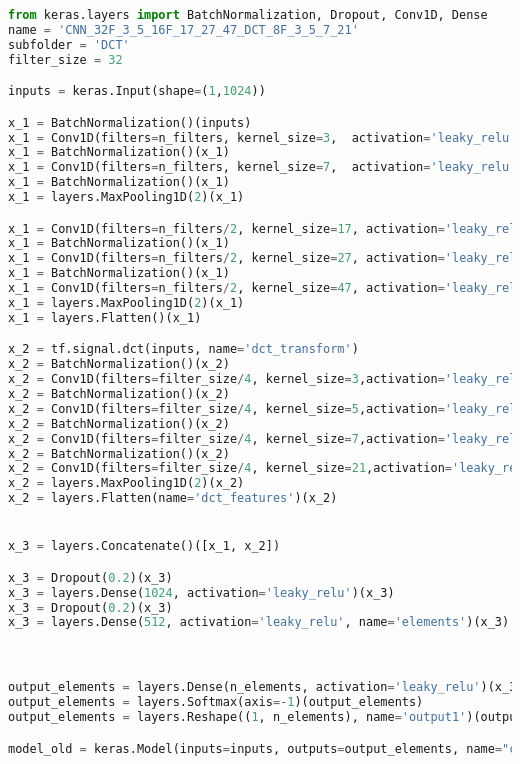 \begin{lstlisting}[language=Python]
from keras.layers import BatchNormalization, Dropout, Conv1D, Dense
name = 'CNN_32F_3_5_16F_17_27_47_DCT_8F_3_5_7_21'
subfolder = 'DCT'
filter_size = 32

inputs = keras.Input(shape=(1,1024))

x_1 = BatchNormalization()(inputs)
x_1 = Conv1D(filters=n_filters, kernel_size=3,  activation='leaky_relu', data_format='channels_first')(x_1)
x_1 = BatchNormalization()(x_1)
x_1 = Conv1D(filters=n_filters, kernel_size=7,  activation='leaky_relu', data_format='channels_first')(x_1)
x_1 = BatchNormalization()(x_1)
x_1 = layers.MaxPooling1D(2)(x_1)

x_1 = Conv1D(filters=n_filters/2, kernel_size=17, activation='leaky_relu', data_format='channels_first')(x_1)
x_1 = BatchNormalization()(x_1)
x_1 = Conv1D(filters=n_filters/2, kernel_size=27, activation='leaky_relu', data_format='channels_first')(x_1)
x_1 = BatchNormalization()(x_1)
x_1 = Conv1D(filters=n_filters/2, kernel_size=47, activation='leaky_relu', data_format='channels_first')(x_1)
x_1 = layers.MaxPooling1D(2)(x_1)
x_1 = layers.Flatten()(x_1)

x_2 = tf.signal.dct(inputs, name='dct_transform')
x_2 = BatchNormalization()(x_2)
x_2 = Conv1D(filters=filter_size/4, kernel_size=3,activation='leaky_relu', data_format='channels_first')(x_2)
x_2 = BatchNormalization()(x_2)
x_2 = Conv1D(filters=filter_size/4, kernel_size=5,activation='leaky_relu', data_format='channels_first')(x_2)
x_2 = BatchNormalization()(x_2)
x_2 = Conv1D(filters=filter_size/4, kernel_size=7,activation='leaky_relu', data_format='channels_first')(x_2)
x_2 = BatchNormalization()(x_2)
x_2 = Conv1D(filters=filter_size/4, kernel_size=21,activation='leaky_relu',data_format='channels_first')(x_2)
x_2 = layers.MaxPooling1D(2)(x_2)
x_2 = layers.Flatten(name='dct_features')(x_2)


x_3 = layers.Concatenate()([x_1, x_2])

x_3 = Dropout(0.2)(x_3)
x_3 = layers.Dense(1024, activation='leaky_relu')(x_3)
x_3 = Dropout(0.2)(x_3)
x_3 = layers.Dense(512, activation='leaky_relu', name='elements')(x_3)



output_elements = layers.Dense(n_elements, activation='leaky_relu')(x_3)
output_elements = layers.Softmax(axis=-1)(output_elements)
output_elements = layers.Reshape((1, n_elements), name='output1')(output_elements)

model_old = keras.Model(inputs=inputs, outputs=output_elements, name="cnn_dct")
\end{lstlisting}


